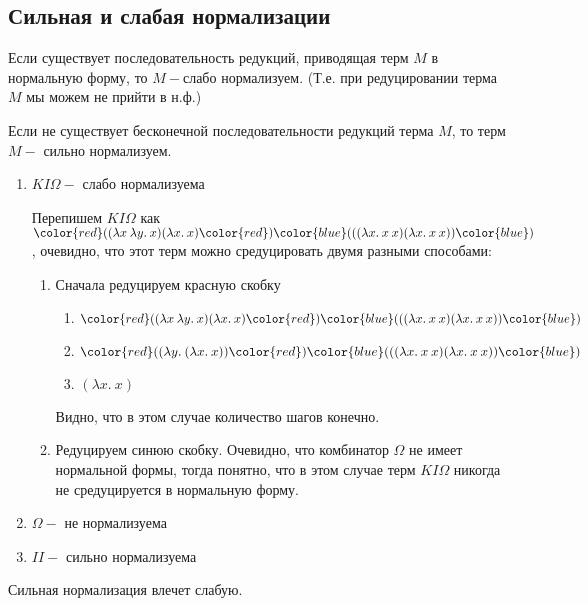	\subsection{Сильная и слабая нормализации}
	\begin{definition}Если существует последовательность редукций, приводящая терм $M$ в нормальную форму, то $M-$слабо нормализуем. (Т.е. при редуцировании терма $M$ мы можем не прийти в н.ф.)\end{definition} 
	\begin{definition}Если не существует бесконечной последовательности редукций терма $M$, то терм $M-$ сильно нормализуем.\end{definition} 
	 \begin{statement}
	 \end{statement}
	 \begin{enumerate}
	 	\item $KI\Omega-$ слабо нормализуема
	 		\begin{example}\end{example}
	 		Перепишем $KI\Omega$ как ${\color{red}(}(\lambda x\:\lambda y.\:x)(\lambda x.\:x){\color{red})}{\color{blue}(}((\lambda x.\:x\:x)(\lambda x.\:x\:x)){\color{blue})}$, очевидно, что этот терм можно средуцировать двумя разными способами:
	 		\begin{enumerate}
	 			\item Сначала редуцируем красную скобку 
	 				\begin{enumerate}
	 					\item ${\color{red}(}(\lambda x\:\lambda y.\:x)(\lambda x.\:x){\color{red})}{\color{blue}(}((\lambda x.\:x\:x)(\lambda x.\:x\:x)){\color{blue})}$
	 					\item ${\color{red}(}(\lambda y.\:(\lambda x.\:x)){\color{red})}{\color{blue}(}((\lambda x.\:x\:x)(\lambda x.\:x\:x)){\color{blue})}$
	 					\item $(\lambda x.\:x)$
	 				\end{enumerate}
	 				Видно, что в этом случае количество шагов конечно.
	 			\item Редуцируем синюю скобку. Очевидно, что комбинатор $\Omega$ не имеет нормальной формы, тогда понятно, что в этом случае терм $KI\Omega$ никогда не средуцируется в нормальную форму.
	 		\end{enumerate}
	 	\item $\Omega-$ не нормализуема
	 	\item $II-$ сильно нормализуема
	 \end{enumerate}
	 \begin{lemma}Сильная нормализация влечет слабую.
	 \end{lemma}
